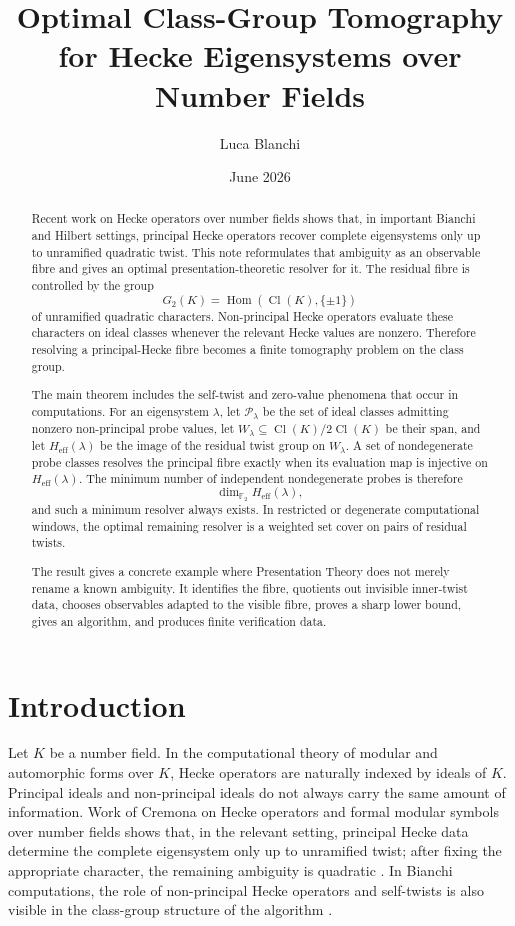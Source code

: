 \documentclass[11pt]{article}
\title{Optimal Class-Group Tomography for Hecke Eigensystems over Number Fields}
\author{Luca Blanchi}
\date{June 2026}
\DeclareMathOperator{\Hom}{Hom}
\DeclareMathOperator{\Cl}{Cl}
\begin{document}
\maketitle

\begin{abstract}
Recent work on Hecke operators over number fields shows that, in important Bianchi and Hilbert settings, principal Hecke operators recover complete eigensystems only up to unramified quadratic twist.  This note reformulates that ambiguity as an observable fibre and gives an optimal presentation-theoretic resolver for it.  The residual fibre is controlled by the group
\[
G_2(K)=\Hom(\Cl(K),\{\pm1\})
\]
of unramified quadratic characters.  Non-principal Hecke operators evaluate these characters on ideal classes whenever the relevant Hecke values are nonzero.  Therefore resolving a principal-Hecke fibre becomes a finite tomography problem on the class group.

The main theorem includes the self-twist and zero-value phenomena that occur in computations.  For an eigensystem \(\lambda\), let \(\mathcal P_\lambda\) be the set of ideal classes admitting nonzero non-principal probe values, let \(W_\lambda\subseteq \Cl(K)/2\Cl(K)\) be their span, and let \(H_{\mathrm{eff}}(\lambda)\) be the image of the residual twist group on \(W_\lambda\).  A set of nondegenerate probe classes resolves the principal fibre exactly when its evaluation map is injective on \(H_{\mathrm{eff}}(\lambda)\).  The minimum number of independent nondegenerate probes is therefore
\[
\dim_{\mathbb F_2}H_{\mathrm{eff}}(\lambda),
\]
and such a minimum resolver always exists.  In restricted or degenerate computational windows, the optimal remaining resolver is a weighted set cover on pairs of residual twists.

The result gives a concrete example where Presentation Theory does not merely rename a known ambiguity.  It identifies the fibre, quotients out invisible inner-twist data, chooses observables adapted to the visible fibre, proves a sharp lower bound, gives an algorithm, and produces finite verification data.
\end{abstract}

\section{Introduction}

Let \(K\) be a number field.  In the computational theory of modular and automorphic forms over \(K\), Hecke operators are naturally indexed by ideals of \(K\).  Principal ideals and non-principal ideals do not always carry the same amount of information.  Work of Cremona on Hecke operators and formal modular symbols over number fields shows that, in the relevant setting, principal Hecke data determine the complete eigensystem only up to unramified twist; after fixing the appropriate character, the remaining ambiguity is quadratic \cite{cremona2026}.  In Bianchi computations, the role of non-principal Hecke operators and self-twists is also visible in the class-group structure of the algorithm \cite{thalagoda-yasaki2025}.
\end{document}

